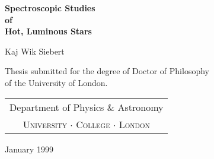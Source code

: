 
\thispagestyle{empty}

\begin{center}

\vspace*{10mm}

\huge
\textbf{Spectroscopic Studies\\of\\Hot, Luminous Stars}

\vspace*{15mm}

\large
Kaj Wik Siebert

\vspace*{\fill}

Thesis submitted for the degree of Doctor of Philosophy \\
of the University of London.

\vspace{15mm}


\vspace{5mm}

\normalsize
\begin{tabular}{c} \hline
Department of Physics \& Astronomy \\
\textsc{University $\cdot$ College $\cdot$ London} \\ \hline
\end{tabular} 

\vspace{0.75cm}

January 1999

\end{center}







